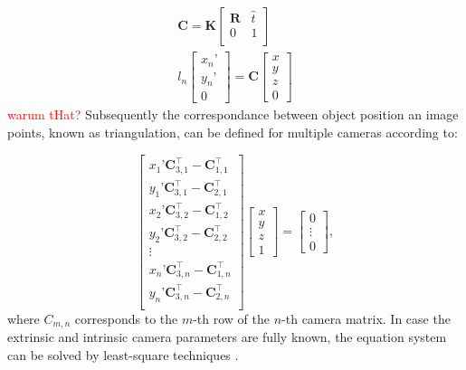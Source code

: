 \documentclass[5p,times,procedia]{elsarticle}
\begin{document}
\begin{align}
	\mathbf{C} = \mathbf{K}
	\begin{bmatrix}
		\mathbf{R} & \hat{t} \\
		0 & 1 \\
	\end{bmatrix} \\
	l_{n}
	\begin{bmatrix}
		x_n’ \\
		y_n’ \\
		0
	\end{bmatrix}
	= \mathbf{C}
	\begin{bmatrix}
		x \\
		y \\
		z \\
		0
	\end{bmatrix}
\end{align}
\textcolor{red}{warum tHat?}
Subsequently the correspondance between object position an image points, known as triangulation, can be defined for multiple cameras according to:

\begin{equation}
	\label{eqn:triangulation}
	\begin{bmatrix}
		x_{1}’ \mathbf{C}_{3,1}^{\top} - \mathbf{C}_{1,1}^{\top}\\
		y_{1}’ \mathbf{C}_{3,1}^{\top} - \mathbf{C}_{2,1}^{\top}\\
		x_{2}’ \mathbf{C}_{3,2}^{\top} - \mathbf{C}_{1,2}^{\top}\\
		y_{2}’ \mathbf{C}_{3,2}^{\top} - \mathbf{C}_{2,2}^{\top}\\
		\vdots \\
		x_{n}’ \mathbf{C}_{3,n}^{\top} - \mathbf{C}_{1,n}^{\top}\\
		y_{n}’ \mathbf{C}_{3,n}^{\top} - \mathbf{C}_{2,n}^{\top}\\
	\end{bmatrix}
	\begin{bmatrix}
		x \\
		y \\
		z \\
		1
	\end{bmatrix}
	=
	\begin{bmatrix}
		0 \\
		\vdots \\
		0
	\end{bmatrix},
\end{equation}
where $C_{m,n}$ corresponds to the $m$-th row of the $n$-th camera matrix.
In case the extrinsic and intrinsic camera parameters are fully known, the equation system can be solved by least-square techniques \cite{Ahn2004}.
\end{document}
